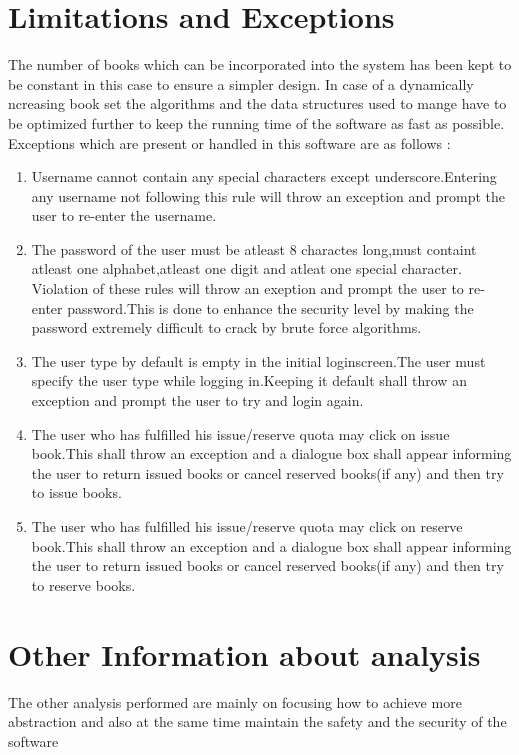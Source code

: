 \documentclass[a4paper]{article}
\begin{document}
\section{Limitations and Exceptions}
The number of books which can be incorporated into the system has been kept to be constant in this case to ensure a simpler design.
In case of a dynamically ncreasing book set the algorithms and the data structures used to mange have to be optimized further to keep the running time of the software as fast as possible.
\\
Exceptions which are present or handled in this software are as follows :
\begin{enumerate}
\item Username cannot contain any special characters except underscore.Entering any username not following this rule will throw an exception and prompt the user to re-enter the username.
\item The password of the user must be atleast 8 charactes long,must containt atleast one alphabet,atleast one digit and atleat one special character. Violation of these rules will throw an exeption and prompt the user to re-enter password.This is done to enhance the security level by making the password extremely difficult to crack by brute force algorithms.
\item The user type by default is empty in the initial  loginscreen.The user must specify the user type while logging in.Keeping it default shall throw an exception and prompt the user to try and login again.
\item The user who has fulfilled his issue/reserve quota may click on issue book.This shall throw an exception and a dialogue box shall appear informing the user to return issued books or cancel reserved books(if any) and then try to issue books.
\item The user who has fulfilled his issue/reserve quota may click on reserve book.This shall throw an exception and a dialogue box shall appear informing the user to return issued books or cancel reserved books(if any) and then try to reserve books.
   
\end{enumerate}
\section{Other Information about analysis}
The other analysis performed are mainly on focusing how to achieve more abstraction and also at the same time maintain the safety and the security of the software
\end{document}
